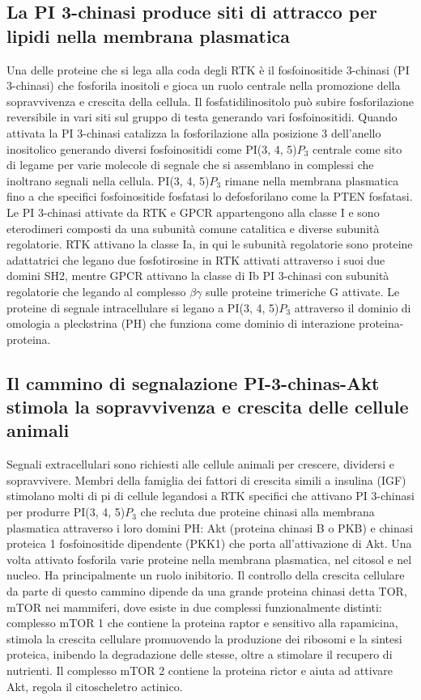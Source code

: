 \subsection{La PI 3-chinasi produce siti di attracco per lipidi nella membrana plasmatica}
Una delle proteine che si lega alla coda degli RTK \`e il fosfoinositide 3-chinasi (PI 3-chinasi) che fosforila inositoli e gioca un ruolo centrale nella promozione della sopravvivenza
e crescita della cellula. Il fosfatidilinositolo pu\`o subire fosforilazione reversibile in vari siti sul gruppo di testa generando vari fosfoinositidi. Quando attivata la PI 3-chinasi
catalizza la fosforilazione alla posizione 3 dell'anello inositolico generando diversi fosfoinositidi come PI(3, 4, 5)$P_3$ centrale come sito di legame per varie molecole di segnale che
si assemblano in complessi che inoltrano segnali nella cellula. PI(3, 4, 5)$P_3$ rimane nella membrana plasmatica fino a che specifici fosfoinositide fosfatasi lo defosforilano come 
la PTEN fosfatasi. Le PI 3-chinasi attivate da RTK e GPCR appartengono alla classe I e sono eterodimeri composti da una subunit\`a comune catalitica e diverse subunit\`a regolatorie. 
RTK attivano la classe Ia, in qui le subunit\`a regolatorie sono proteine adattatrici che legano due fosfotirosine in RTK attivati attraverso i suoi due domini SH2, mentre GPCR attivano
la classe di Ib PI 3-chinasi con subunit\`a regolatorie che legando al complesso $\beta\gamma$ sulle proteine trimeriche G attivate. Le proteine di segnale intracellulare si legano a 
PI(3, 4, 5)$P_3$ attraverso il dominio di omologia a pleckstrina (PH) che funziona come dominio di interazione proteina-proteina.
\subsection{Il cammino di segnalazione PI-3-chinas-Akt stimola la sopravvivenza e crescita delle cellule animali}
Segnali extracellulari sono richiesti alle cellule animali per crescere, dividersi e sopravvivere. Membri della famiglia dei fattori di crescita simili a insulina (IGF) stimolano 
molti di pi di cellule legandosi a RTK specifici che attivano PI 3-chinasi per produrre PI(3, 4, 5)$P_3$ che recluta due proteine chinasi alla membrana plasmatica attraverso i 
loro domini PH: Akt (proteina chinasi B o PKB) e chinasi proteica 1 fosfoinositide dipendente (PKK1) che porta all'attivazione di Akt. Una volta attivato fosforila varie proteine nella
membrana plasmatica, nel citosol e nel nucleo. Ha principalmente un ruolo inibitorio. Il controllo della crescita cellulare da parte di questo cammino dipende da una grande proteina
chinasi detta TOR, mTOR nei mammiferi, dove esiste in due complessi funzionalmente distinti: complesso mTOR 1 che contiene la proteina raptor e sensitivo  alla rapamicina, stimola
la crescita cellulare promuovendo la produzione dei ribosomi e la sintesi proteica, inibendo la degradazione delle stesse, oltre a stimolare il recupero di nutrienti. Il complesso mTOR 2
contiene  la proteina rictor e aiuta ad attivare Akt, regola il citoscheletro actinico. 
